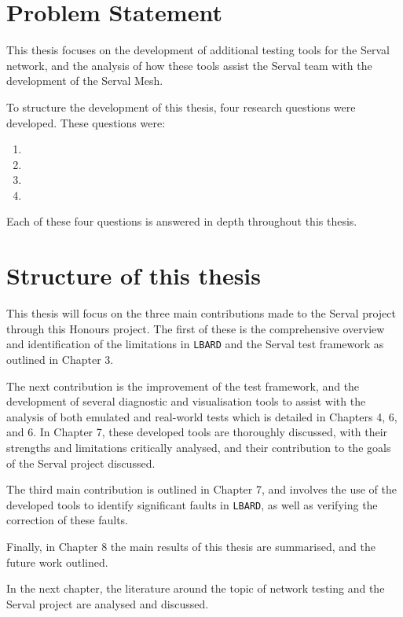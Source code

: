 \section{Problem Statement}
This thesis focuses on the development of additional testing tools for the Serval network, and the analysis of how these tools assist the Serval team with the development of the Serval Mesh.

To structure the development of this thesis, four research questions were developed.
These questions were:
\begin{enumerate}
    \item \firstRQ
    \item \secondRQ
    \item \thirdRQ
    \item \fourthRQ
\end{enumerate}
Each of these four questions is answered in depth throughout this thesis.


\section{Structure of this thesis}
This thesis will focus on the three main contributions made to the Serval project through this Honours project.
The first of these is the comprehensive overview and identification of the limitations in \texttt{LBARD} and the Serval test framework as outlined in Chapter 3.

The next contribution is the improvement of the test framework, and the development of several diagnostic and visualisation tools to assist with the analysis of both emulated and real-world tests which is detailed in Chapters 4, 6, and 6. 
In Chapter 7, these developed tools are thoroughly discussed, with their strengths and limitations critically analysed, and their contribution to the goals of the Serval project discussed.

The third main contribution is outlined in Chapter 7, and involves the use of the developed tools to identify significant faults in \texttt{LBARD}, as well as verifying the correction of these faults.

Finally, in Chapter 8 the main results of this thesis are summarised, and the future work outlined.

In the next chapter, the literature around the topic of network testing and the Serval project are analysed and discussed.


